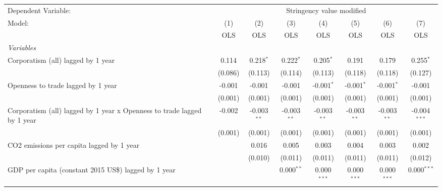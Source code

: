 
\begingroup
\centering
\begin{tabular}{lccccccc}
   \toprule
   Dependent Variable: & \multicolumn{7}{c}{Stringency value modified}\\
   Model:                                                                  & (1)     & (2)           & (3)           & (4)           & (5)           & (6)           & (7)\\  
                                                                           &  OLS    & OLS           & OLS           & OLS           & OLS           & OLS           & OLS\\  
   \midrule
   \emph{Variables}\\
   Corporatism (all) lagged by 1 year                                      & 0.114   & 0.218$^{*}$   & 0.222$^{*}$   & 0.205$^{*}$   & 0.191         & 0.179         & 0.255$^{*}$\\   
                                                                           & (0.086) & (0.113)       & (0.114)       & (0.113)       & (0.118)       & (0.118)       & (0.127)\\   
   Openness to trade lagged by 1 year                                      & -0.001  & -0.001        & -0.001        & -0.001$^{*}$  & -0.001$^{*}$  & -0.001$^{*}$  & -0.001\\   
                                                                           & (0.001) & (0.001)       & (0.001)       & (0.001)       & (0.001)       & (0.001)       & (0.001)\\   
   Corporatism (all) lagged by 1 year x Openness to trade lagged by 1 year & -0.002  & -0.003$^{**}$ & -0.003$^{**}$ & -0.003$^{**}$ & -0.003$^{**}$ & -0.003$^{**}$ & -0.004$^{***}$\\   
                                                                           & (0.001) & (0.001)       & (0.001)       & (0.001)       & (0.001)       & (0.001)       & (0.001)\\   
   CO2 emissions per capita lagged by 1 year                               &         & 0.016         & 0.005         & 0.003         & 0.004         & 0.003         & 0.002\\   
                                                                           &         & (0.010)       & (0.011)       & (0.011)       & (0.011)       & (0.011)       & (0.012)\\   
   GDP per capita (constant 2015 US\$) lagged by 1 year                    &         &               & 0.000$^{**}$  & 0.000$^{***}$ & 0.000$^{***}$ & 0.000$^{***}$ & 0.000$^{***}$\\   

\end{tabular}
